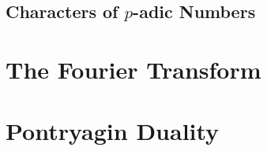 \documentclass[10pt]{mypackage}
\begin{document}
\subsection{Characters of $p$-adic Numbers}%

\section{The Fourier Transform}%
\section{Pontryagin Duality}%
\nocite{folland_abstract_harmonic_analysis}
\printbibliography
\end{document}
